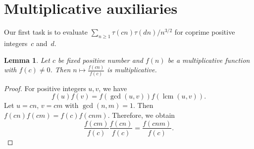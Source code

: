 \documentclass[a4paper,12pt, reqn0]{amsart}
\newtheorem{lemma}{Lemma}[section]
\theoremstyle{remark}
\DeclareMathOperator{\lcm}{lcm}
\begin{document}
\section{Multiplicative auxiliaries}
Our first task is to evaluate
$
  \sum_{n\ge1}{\tau(cn)\tau(dn)}/{n^{3/2}}
$
for coprime positive integers~$c$ and~$d$. 
\begin{lemma}\label{multiplicativity}
  Let $c$ be fixed positive number and $f(n)$ be a multiplicative
  function with $f(c)\neq 0$. Then $n\mapsto\frac{f(cn)}{f(c)}$ is
  multiplicative.
\end{lemma}
\begin{proof}
  For positive integers $u,v$, we
  have \begin{equation*}
    f(u)f(v)=f(\gcd(u,v))f(\lcm(u,v)).
  \end{equation*}
  Let $u=cn$, $v=cm$ with $\gcd(n,m)=1$. Then $f(cn)f(cm)=f(c)f(cnm)$.
  Therefore, we obtain
  \begin{equation*}
    \frac{f(cm)}{f(c)}\frac{f(cn)}{f(c)}=\frac{f(cnm)}{f(c)}.
  \end{equation*}
\end{proof}
\end{document}
